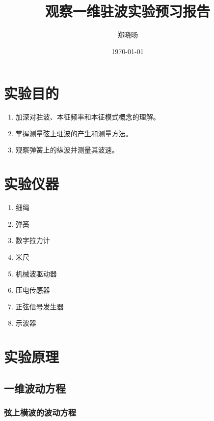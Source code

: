 \documentclass[UTF8]{ctexart}
\title{观察一维驻波实验预习报告}
\author{郑晓旸}
\date{\today}
\begin{document}
\fancyfoot[C]{\thepage}

\maketitle
\tableofcontents
\newpage

\section{实验目的}
    \begin{enumerate}
        \item 加深对驻波、本征频率和本征模式概念的理解。
        \item 掌握测量弦上驻波的产生和测量方法。
        \item 观察弹簧上的纵波并测量其波速。
    \end{enumerate}

\section{实验仪器}
\begin{enumerate}
    \item 细绳
    \item 弹簧 
    \item 数字拉力计 
    \item 米尺 
    \item 机械波驱动器 
    \item 压电传感器 
    \item 正弦信号发生器 
    \item 示波器
\end{enumerate}

\section{实验原理}

\subsection{一维波动方程}

\subsubsection{弦上横波的波动方程}
\end{document}
